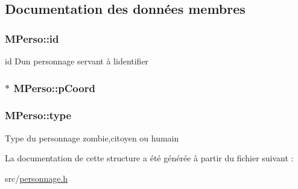 \subsection{Documentation des données membres}
\subsubsection[{\texorpdfstring{id}{id}}]{\setlength{\rightskip}{0pt plus 5cm}M\+Perso\+::id}\hypertarget{structMPerso_af6a4c47de69856669b2f1810d4c870e7}{}\label{structMPerso_af6a4c47de69856669b2f1810d4c870e7}
id D\textquotesingle{}un personnage servant à l\textquotesingle{}identifier 
\subsubsection[{\texorpdfstring{p\+Coord}{pCoord}}]{$\ast$ M\+Perso\+::p\+Coord}\hypertarget{structMPerso_aa1a6adaf74d536a913f11ed632ddb8d1}{}\label{structMPerso_aa1a6adaf74d536a913f11ed632ddb8d1}
\subsubsection[{\texorpdfstring{type}{type}}]{\setlength{\rightskip}{0pt plus 5cm}M\+Perso\+::type}\hypertarget{structMPerso_a476ff327af93f97f1ae6408e2ebc1986}{}\label{structMPerso_a476ff327af93f97f1ae6408e2ebc1986}
Type du personnage zombie,citoyen ou humain 

La documentation de cette structure a été générée à partir du fichier suivant \+:\begin{DoxyCompactItemize}
\item 
src/\hyperlink{personnage_8h}{personnage.\+h}\end{DoxyCompactItemize}
